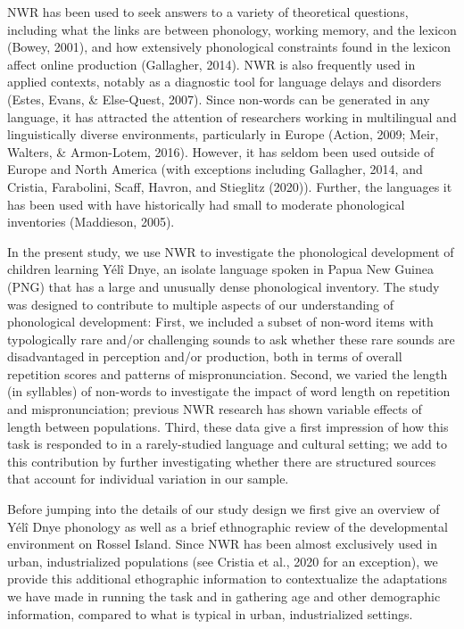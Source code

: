 \documentclass[english,,man,floatsintext]{apa6}
\begin{document}
NWR has been used to seek answers to a variety of theoretical questions,
including what the links are between phonology, working memory, and the
lexicon (Bowey, 2001), and how extensively phonological constraints
found in the lexicon affect online production (Gallagher, 2014). NWR is
also frequently used in applied contexts, notably as a diagnostic tool
for language delays and disorders (Estes, Evans, \& Else-Quest, 2007).
Since non-words can be generated in any language, it has attracted the
attention of researchers working in multilingual and linguistically
diverse environments, particularly in Europe (Action, 2009; Meir,
Walters, \& Armon-Lotem, 2016). However, it has seldom been used outside
of Europe and North America (with exceptions including Gallagher, 2014,
and Cristia, Farabolini, Scaff, Havron, and Stieglitz (2020)). Further,
the languages it has been used with have historically had small to
moderate phonological inventories (Maddieson, 2005).

In the present study, we use NWR to investigate the phonological
development of children learning Yélî Dnye, an isolate language spoken
in Papua New Guinea (PNG) that has a large and unusually dense
phonological inventory. The study was designed to contribute to multiple
aspects of our understanding of phonological development: First, we
included a subset of non-word items with typologically rare and/or
challenging sounds to ask whether these rare sounds are disadvantaged in
perception and/or production, both in terms of overall repetition scores
and patterns of mispronunciation. Second, we varied the length (in
syllables) of non-words to investigate the impact of word length on
repetition and mispronunciation; previous NWR research has shown
variable effects of length between populations. Third, these data give a
first impression of how this task is responded to in a rarely-studied
language and cultural setting; we add to this contribution by further
investigating whether there are structured sources that account for
individual variation in our sample.

Before jumping into the details of our study design we first give an
overview of Yélî Dnye phonology as well as a brief ethnographic review
of the developmental environment on Rossel Island. Since NWR has been
almost exclusively used in urban, industrialized populations (see
Cristia et al., 2020 for an exception), we provide this additional
ethographic information to contextualize the adaptations we have made in
running the task and in gathering age and other demographic information,
compared to what is typical in urban, industrialized settings.
\end{document}
